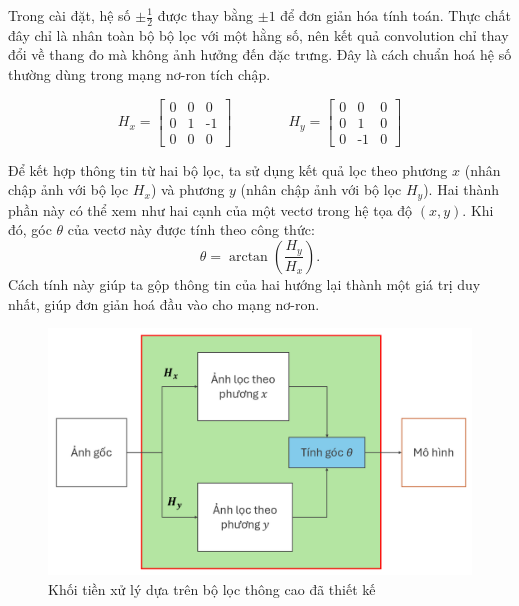 Trong cài đặt, hệ số $\pm \tfrac{1}{2}$ được thay bằng $\pm 1$ để đơn giản hóa tính toán. Thực chất đây chỉ là nhân toàn bộ bộ lọc với một hằng số, nên kết quả \gls{convolution} chỉ thay đổi về thang đo mà không ảnh hưởng đến đặc trưng. Đây là cách chuẩn hoá hệ số thường dùng trong mạng nơ-ron tích chập.

\[
H_x = \begin{bmatrix}
	0 & 0 & 0 \\
	0 & 1 &  \text{-}1 \\
	0 & 0 & 0
\end{bmatrix} \qquad \qquad
H_y = \begin{bmatrix}
	0 & 0 & 0 \\
	0 & 1 &  0 \\
	0 & \text{-}1 & 0
\end{bmatrix}
\]

Để kết hợp thông tin từ hai bộ lọc, ta sử dụng kết quả lọc theo phương $x$ (nhân chập ảnh với bộ lọc $H_x$) và phương $y$ (nhân chập ảnh với bộ lọc $H_y$). Hai thành phần này có thể xem như hai cạnh của một vectơ trong hệ tọa độ $(x,y)$. Khi đó, góc $\theta$ của vectơ này được tính theo công thức:
\[
\theta = \arctan\left(\frac{H_y}{H_x}\right).
\]
Cách tính này giúp ta gộp thông tin của hai hướng lại thành một giá trị duy nhất, giúp đơn giản hoá đầu vào cho mạng nơ-ron.

%
\begin{figure}[h!]
	\centering
	\includegraphics[width=1.0\linewidth]{Images/adof.png}
	\begin{minipage}{1.0\linewidth}
		\vspace{5mm}
		\caption{Khối tiền xử lý dựa trên bộ lọc thông cao đã thiết kế}
		\label{fig:adof}
	\end{minipage}
\end{figure}
%



